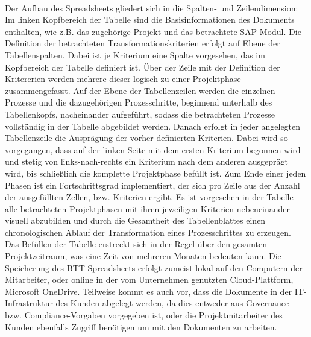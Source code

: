 \\Der Aufbau des Spreadsheets gliedert sich in die Spalten- und Zeilendimension: Im linken Kopfbereich der Tabelle sind die Basisinformationen des Dokuments enthalten, wie z.B. das zugehörige Projekt und das betrachtete SAP-Modul. Die Definition der betrachteten Transformationskriterien erfolgt auf Ebene der Tabellenspalten. Dabei ist je Kriterium eine Spalte vorgesehen, das im Kopfbereich der Tabelle definiert ist. Über der Zeile mit der Definition der Kritererien werden mehrere dieser logisch zu einer Projektphase zusammengefasst. Auf der Ebene der Tabellenzeilen werden die einzelnen Prozesse und die dazugehörigen Prozesschritte, beginnend unterhalb des Tabellenkopfs, nacheinander aufgeführt, sodass die betrachteten Prozesse vollständig in der Tabelle abgebildet werden. Danach erfolgt in jeder angelegten Tabellenzeile die Ausprägung der vorher definierten Kriterien. Dabei wird so vorgegangen, dass auf der linken Seite mit dem ersten Kriterium begonnen wird und stetig von links-nach-rechts ein Kriterium nach dem anderen ausgeprägt wird, bis schließlich die komplette Projektphase befüllt ist. Zum Ende einer jeden Phasen ist ein Fortschrittsgrad implementiert, der sich pro Zeile aus der Anzahl der ausgefüllten Zellen, bzw. Kriterien ergibt. Es ist vorgesehen in der Tabelle alle betrachteten Projektphasen mit ihren jeweiligen Kriterien nebeneinander visuell abzubilden und durch die Gesamtheit des Tabellenblattes einen chronologischen Ablauf der Transformation eines Prozesschrittes zu erzeugen.\\Das Befüllen der Tabelle erstreckt sich in der Regel über den gesamten Projektzeitraum, was eine Zeit von mehreren Monaten bedeuten kann. Die Speicherung des BTT-Spreadsheets erfolgt zumeist lokal auf den Computern der Mitarbeiter, oder online in der vom Unternehmen genutzten Cloud-Plattform, \glqq{}Microsoft OneDrive\grqq{}. Teilweise kommt es auch vor, dass die Dokumente in der IT-Infrastruktur des Kunden abgelegt werden, da dies entweder aus Governance- bzw. Compliance-Vorgaben vorgegeben ist, oder die Projektmitarbeiter des Kunden ebenfalls Zugriff benötigen um mit den Dokumenten zu arbeiten.


